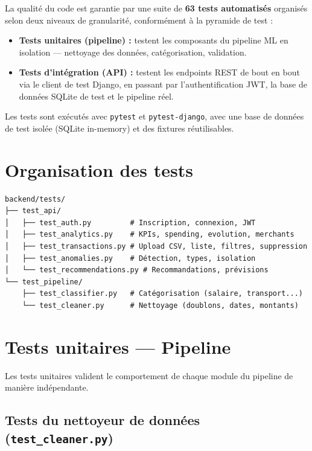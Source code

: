 \documentclass[12pt,a4paper]{report}
\begin{document}
La qualité du code est garantie par une suite de \textbf{63 tests automatisés}
organisés selon deux niveaux de granularité, conformément à la pyramide de test :

\begin{itemize}
  \item \textbf{Tests unitaires (pipeline) :} testent les composants du pipeline
    ML en isolation — nettoyage des données, catégorisation, validation.
  \item \textbf{Tests d'intégration (API) :} testent les endpoints REST de bout
    en bout via le client de test Django, en passant par l'authentification JWT,
    la base de données SQLite de test et le pipeline réel.
\end{itemize}

Les tests sont exécutés avec \texttt{pytest} et \texttt{pytest-django},
avec une base de données de test isolée (SQLite in-memory) et des fixtures
réutilisables.

\section{Organisation des tests}

\begin{lstlisting}[style=bash, caption={Arborescence de la suite de tests},
                   label={lst:test-structure}]
backend/tests/
├── test_api/
│   ├── test_auth.py         # Inscription, connexion, JWT
│   ├── test_analytics.py    # KPIs, spending, evolution, merchants
│   ├── test_transactions.py # Upload CSV, liste, filtres, suppression
│   ├── test_anomalies.py    # Détection, types, isolation
│   └── test_recommendations.py # Recommandations, prévisions
└── test_pipeline/
    ├── test_classifier.py   # Catégorisation (salaire, transport...)
    └── test_cleaner.py      # Nettoyage (doublons, dates, montants)
\end{lstlisting}

\section{Tests unitaires — Pipeline}

Les tests unitaires valident le comportement de chaque module du pipeline
de manière indépendante.

\subsection{Tests du nettoyeur de données (\texttt{test\_cleaner.py})}
\end{document}
